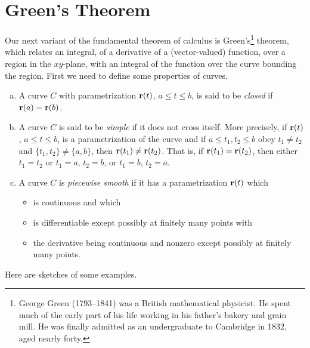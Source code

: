 \section{Green's Theorem}\label{sec:GreenThm}
Our next variant of the fundamental theorem of calculus is 
Green's\footnote{George Green (1793--1841) was a British 
mathematical physicist. He spent much of the early part of his life
working in his father's bakery and grain mill. He was finally admitted
as an undergraduate to Cambridge in 1832, aged nearly forty.} theorem, which 
relates an integral, of a derivative of a (vector-valued) function,
over a region  in the $xy$-plane, with an integral of the function
over the curve bounding the region. 
First we need to define some properties of curves.

\begin{defn}\label{def:Green}

\begin{enumerate}[(a)]
\item 
A curve $C$ with parametrization $\mathbf{r}(t)$, $a\le t\le b$, is said to be 
\emph{closed} if $\mathbf{r}(a)=\mathbf{r}(b)$.

\item 
A curve $C$ is said to be \emph{simple} if it does not cross itself.
More precisely, if $\mathbf{r}(t)$, $a\le t\le b$, is a parametrization of the
curve and if $a\le t_1,t_2\le b$ obey $t_1\ne t_2$ and $\{t_1,t_2\}
\ne\{a,b\}$, then $\mathbf{r}(t_1)\ne \mathbf{r}(t_2)$. That is, if $\mathbf{r}(t_1)=\mathbf{r}(t_2)$,
then either $t_1=t_2$ or $t_1=a$, $t_2=b$, or $t_1=b$, $t_2=a$.

\item 
A curve $C$ is \emph{piecewise smooth} if it has a parametrization
$\mathbf{r}(t)$ which
\begin{itemize}  \itemsep1pt \parskip0pt  %
\item
is continuous and which
\item
is differentiable except possibly at finitely many points with
\item
the derivative being continuous and nonzero except possibly at finitely 
many points.
\end{itemize}
\end{enumerate}
\end{defn}
\noindent Here are sketches of some examples.

